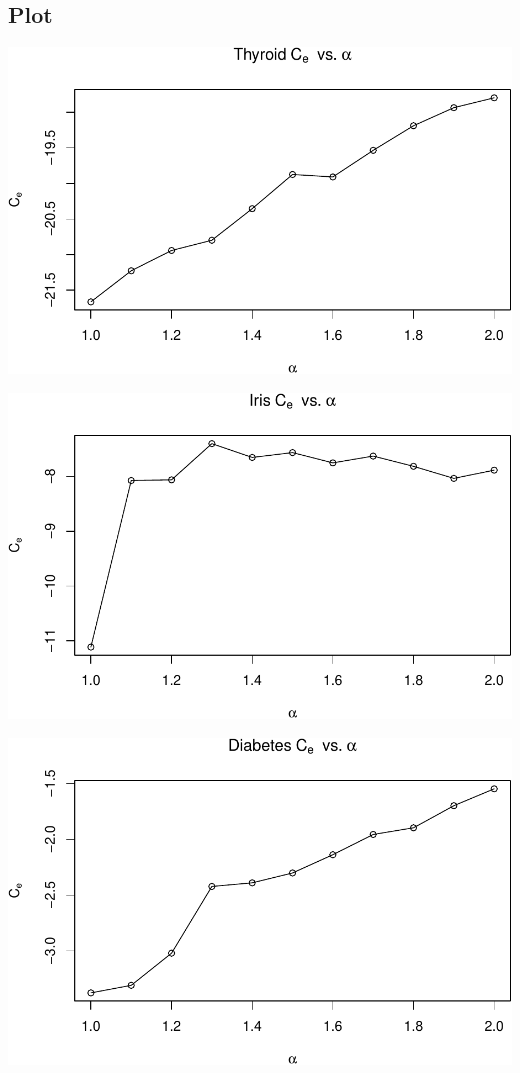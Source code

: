 \documentclass[]{article}
\begin{document}
\subsection{Plot}\label{plot-1}

\begin{center}\includegraphics[width=1\linewidth]{Report_files/figure-latex/unnamed-chunk-22-1} \end{center}

\begin{center}\includegraphics[width=1\linewidth]{Report_files/figure-latex/unnamed-chunk-22-2} \end{center}

\begin{center}\includegraphics[width=1\linewidth]{Report_files/figure-latex/unnamed-chunk-22-3} \end{center}
\end{document}
